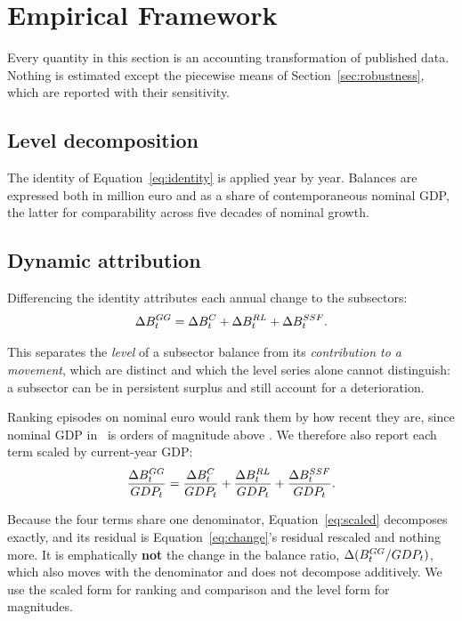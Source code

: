 
\section{Empirical Framework}
\label{sec:method}

Every quantity in this section is an accounting transformation of published data.
Nothing is estimated except the piecewise means of Section~\ref{sec:robustness},
which are reported with their sensitivity.

\subsection{Level decomposition}

The identity of Equation~\eqref{eq:identity} is applied year by year. Balances are
expressed both in million euro and as a share of contemporaneous nominal GDP, the
latter for comparability across five decades of nominal growth.

\subsection{Dynamic attribution}

Differencing the identity attributes each annual change to the subsectors:
\begin{equation}
\Delta B^{GG}_t = \Delta B^{C}_t + \Delta B^{RL}_t + \Delta B^{SSF}_t.
\label{eq:change}
\end{equation}

This separates the \emph{level} of a subsector balance from its \emph{contribution
to a movement}, which are distinct and which the level series alone cannot
distinguish: a subsector can be in persistent surplus and still account for a
deterioration.

Ranking episodes on nominal euro would rank them by how recent they are, since
nominal GDP in \PanelEnd\ is orders of magnitude above \PanelStart. We therefore
also report each term scaled by current-year GDP:
\begin{equation}
\frac{\Delta B^{GG}_t}{GDP_t}
= \frac{\Delta B^{C}_t}{GDP_t}
+ \frac{\Delta B^{RL}_t}{GDP_t}
+ \frac{\Delta B^{SSF}_t}{GDP_t}.
\label{eq:scaled}
\end{equation}

Because the four terms share one denominator, Equation~\eqref{eq:scaled} decomposes
exactly, and its residual is Equation~\eqref{eq:change}'s residual rescaled and
nothing more. It is emphatically \textbf{not} the change in the balance ratio,
$\Delta(B^{GG}_t/GDP_t)$, which also moves with the denominator and does not
decompose additively. We use the scaled form for ranking and comparison and the
level form for magnitudes.

